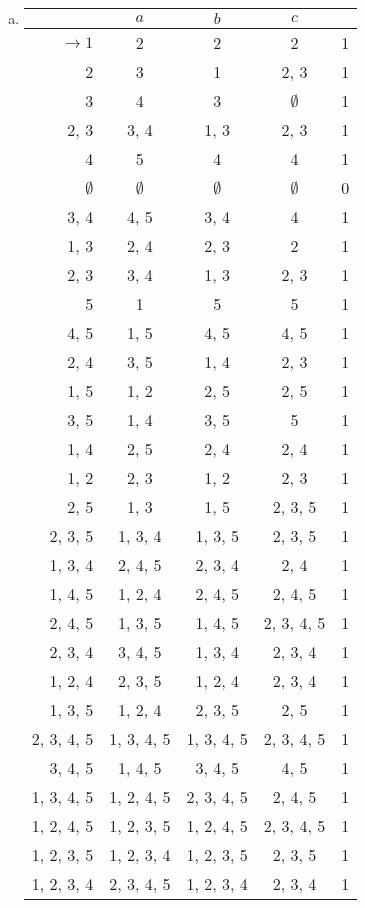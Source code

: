\begin{solution}
\begin{enumerate}[(a)]
\item\begin{tabular}[t]{r|c c c r}
    & $a$ & $b$ & $c$ &\\\hline
       $\to1$ & 2 & 2 & 2 & 1\\
       2 & 3 & 1 & 2, 3 & 1\\
       3 & 4 & 3 & $\emptyset$ & 1\\
       2, 3 & 3, 4 & 1, 3 & 2, 3 & 1\\
       4 & 5 & 4 & 4 & 1\\
       $\emptyset$ & $\emptyset$ & $\emptyset$ & $\emptyset$ & 0\\
       3, 4 & 4, 5 & 3, 4 & 4 & 1\\
       1, 3 & 2, 4 & 2, 3 & 2 & 1\\
       2, 3 & 3, 4 & 1, 3 & 2, 3 & 1\\
       5 & 1 & 5 & 5 & 1\\
       4, 5 & 1, 5 & 4, 5 & 4, 5 & 1\\
       2, 4 & 3, 5 & 1, 4 & 2, 3 & 1\\
       1, 5 & 1, 2 & 2, 5 & 2, 5 & 1\\
       3, 5 & 1, 4 & 3, 5 & 5 & 1\\
       1, 4 & 2, 5 & 2, 4 & 2, 4 & 1\\
       1, 2 & 2, 3 & 1, 2 & 2, 3 & 1\\
       2, 5 & 1, 3 & 1, 5 & 2, 3, 5 & 1\\
       2, 3, 5 & 1, 3, 4 & 1, 3, 5 & 2, 3, 5 & 1\\
       1, 3, 4 & 2, 4, 5 & 2, 3, 4 & 2, 4 & 1\\
       1, 4, 5 & 1, 2, 4 & 2, 4, 5 & 2, 4, 5 & 1\\
       2, 4, 5 & 1, 3, 5 & 1, 4, 5 & 2, 3, 4, 5 & 1\\
       2, 3, 4 & 3, 4, 5 & 1, 3, 4 & 2, 3, 4 & 1\\
       1, 2, 4 & 2, 3, 5 & 1, 2, 4 & 2, 3, 4 & 1\\
       1, 3, 5 & 1, 2, 4 & 2, 3, 5 & 2, 5 & 1\\
       2, 3, 4, 5 & 1, 3, 4, 5 & 1, 3, 4, 5 & 2, 3, 4, 5 & 1\\
       3, 4, 5 & 1, 4, 5 & 3, 4, 5 & 4, 5 & 1\\
       1, 3, 4, 5 & 1, 2, 4, 5 & 2, 3, 4, 5 & 2, 4, 5 & 1\\
       1, 2, 4, 5 & 1, 2, 3, 5 & 1, 2, 4, 5 & 2, 3, 4, 5 & 1\\
       1, 2, 3, 5 & 1, 2, 3, 4 & 1, 2, 3, 5 & 2, 3, 5 & 1\\
       1, 2, 3, 4 & 2, 3, 4, 5 & 1, 2, 3, 4 & 2, 3, 4 & 1\\
   \end{tabular}
\end{enumerate}
\end{solution}

